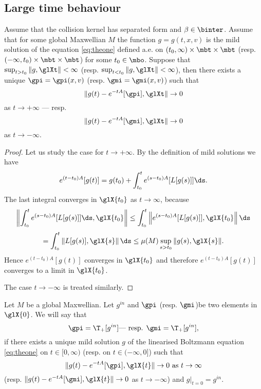 \subsection{Large time behaviour} %
\label{ssec:large_time_behaviour}


\begin{theorem}
	\label{th:limits}
	Assume that the collision kernel has separated form and $\beta \in   \binter $. Assume that for some global Maxwellian $M$ the function $g=g(t,x,v)$ is the mild solution of the equation \eqref{eq:theone} defined a.e. on $(t_0,\infty)\times\mbt\times\mbt$ (resp. $(-\infty,t_0)\times\mbt\times\mbt$) for some $t_0\in\mbo$. Suppose that
 $\sup_{t>t_0}\|g,\glXt\|< \infty $ (resp. $\sup_{t<t_0}\|g,\glXt\|< \infty $), then there exists a unique $\gpi=\gpi(x,v)$ (resp. $\gmi=\gmi(x,v)$) such that
 \[\|g(t)-e^{-tA}[\gpi],\glXt\|\to0\]
as $t\to+\infty$ --- resp.
 \[\|g(t)-e^{-tA}[\gmi],\glXt\|\to0\]
as $t\to-\infty$.


\end{theorem}
\begin{proof}
Let us study the case for $t\to+ \infty$.
	By the definition of mild solutions we have 
\[e^{(t-t_0)A}[g(t)]=g(t_0)+\int_{t_0}^te^{(s-t_0)A}[L[g(s)]]\ds.\]
The last integral converges in $\glX{t_0}$ as $t\to\infty$, because
\[\left\|\int_{t_0}^te^{(s-t_0)A}[L[g(s)]]\ds,\glX{t_0}\right\|\le \int_{t_0}^t\left\|e^{(s-t_0)A}[L[g(s)]],\glX{t_0}\right\|\ds\]
\[=\int_{t_0}^t\left\| L[g(s)],\glX{s}\right\|\ds\le  \mu(M)\sup_{s>t_0}\|g(s),\glX{s}\|. \]
Hence $e^{(t-t_0)A}[g(t)]$ converges in $\glX{t_0}$ and therefore $e^{(t-t_0)A}[g(t)]$ converges to a limit in $\glX{t_0}$.

The case $t\to - \infty$ is treated similarly.
\end{proof}

\begin{definition}
Let $M$ be a global Maxwellian. 
	Let $g^{in}$ and $\gpi$ (resp. $\gmi$)be two elements in $\glX{0}$. We will say that
	\[\gpi = \T_+[g^{in}]\mbox{--- resp. } \gmi = \T_+[g^{in}],\] if there exists a unique mild solution $g$ of the linearised Boltzmann equation \eqref{eq:theone} on $t\in[0, \infty)$ (resp. on $t\in (-\infty,0]$) such that \[\|g(t)-e^{-tA}[\gpi],\glX{t}\|\to0 \mbox{ as } t\to \infty\] (resp. $\|g(t)-e^{-tA}[\gmi],\glX{t}\|\to0$ as $t\to- \infty$) and $g|_{t=0}=g^{in}$.
\end{definition}
 
